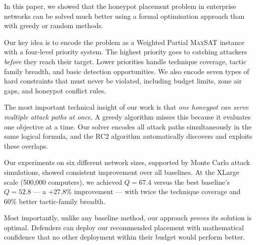 \documentclass[journal]{IEEEtran}
\newcommand{\maxsat}{\textsc{MaxSAT}}
\newcommand{\rcII}{\textsc{RC2}}
\begin{document}
In this paper, we showed that the honeypot placement problem in
enterprise networks can be solved much better using a formal
optimisation approach than with greedy or random methods.

Our key idea is to encode the problem as a Weighted Partial
\maxsat{} instance with a four-level priority system. The highest
priority goes to catching attackers \emph{before} they reach their
target. Lower priorities handle technique coverage, tactic family
breadth, and basic detection opportunities. We also encode seven
types of hard constraints that must never be violated, including
budget limits, zone air gaps, and honeypot conflict rules.

The most important technical insight of our work is that
\emph{one honeypot can serve multiple attack paths at once}. A
greedy algorithm misses this because it evaluates one objective
at a time. Our solver encodes all attack paths simultaneously in
the same logical formula, and the \rcII{} algorithm automatically
discovers and exploits these overlaps.

Our experiments on six different network sizes, supported by
Monte Carlo attack simulations, showed consistent improvement over
all baselines. At the XLarge scale (500,000 computers), we achieved
$Q = 67.4$ versus the best baseline's $Q = 52.8$ --- a $+27.8\%$
improvement --- with twice the technique coverage and 60\% better
tactic-family breadth.

Most importantly, unlike any baseline method, our approach
\emph{proves} its solution is optimal. Defenders can deploy our
recommended placement with mathematical confidence that no other
deployment within their budget would perform better.
\end{document}

